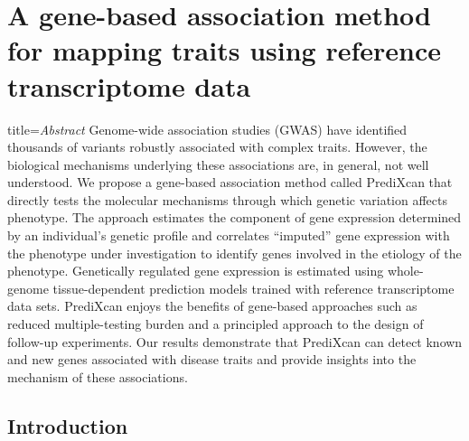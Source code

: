 \documentclass[../main.tex]{subfiles}
\begin{document}
\chapter[A gene-based association method for mapping traits]{A 
	gene-based association method for mapping traits using reference 
	transcriptome data}


\begin{external_abstract}{title=\textit{Abstract}}
Genome-wide association studies (GWAS) have identified thousands of 
variants robustly associated with complex traits. However, the 
biological mechanisms underlying these associations are, in general, not 
well understood. We propose a gene-based association method called 
PrediXcan that directly tests the molecular mechanisms through which 
genetic variation affects phenotype. The approach estimates the 
component of gene expression determined by an individual's genetic 
profile and correlates \enquote{imputed} gene expression with the 
phenotype under investigation to identify genes involved in the etiology 
of the phenotype. Genetically regulated gene expression is estimated 
using whole-genome tissue-dependent prediction models trained with 
reference transcriptome data sets. PrediXcan enjoys the benefits of 
gene-based approaches such as reduced multiple-testing burden and a 
principled approach to the design of follow-up experiments. Our results 
demonstrate that PrediXcan can detect known and new genes associated 
with disease traits and provide insights into the mechanism of these 
associations.
\end{external_abstract}

\section{Introduction}

\end{document}
